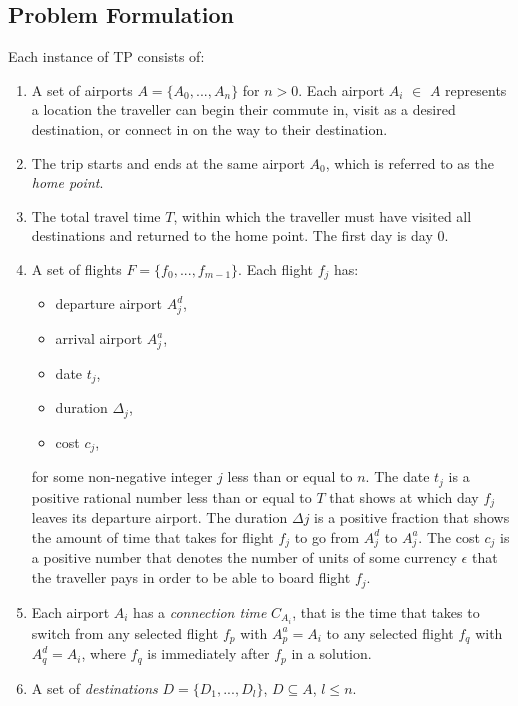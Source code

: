 \documentclass{mpaper}
\begin{document}
\subsection{Problem Formulation}
\label{sec:tpformulation}
Each instance of TP consists of:
\begin{enumerate}[topsep=0.1pt]
\setlength\itemsep{0.1em}
\item A set of airports $A = \{ A_{0},...,A_{n} \}$ for $n > 0$. Each airport $A_{i}$ $\in$ $A$ represents a location the traveller can begin their commute in, visit as a desired destination, or connect in on the way to their destination.

\item The trip starts and ends at the same airport $A_{0}$, which is referred to as the \textit{home point}.

\item The total travel time $T$, within which the traveller must have visited all destinations and returned to the home point. The first day is day 0.
 
\item A set of flights $F = \{ f_{0},...,f_{m-1} \}$. Each flight $f_{j}$ has:
\begin{itemize}[topsep=1pt]
\setlength\itemsep{0.1em}
\item departure airport $A^{d}_{j}$,
\item arrival airport $A^{a}_{j}$,
\item date $t_{j}$,
\item duration $\Delta_{j}$,
\item cost $c_{j}$,
\end{itemize} 
for some non-negative integer $j$ less than or equal to $n$.
The date $t_{j}$ is a positive rational number less than or equal to $T$ that shows at which day $f_{j}$ leaves its departure airport. The duration $\Delta{j}$ is a positive fraction that shows the amount of time that takes for flight $f_{j}$ to go from $A^{d}_{j}$ to $A^{a}_{j}$. The cost $c_{j}$ is a positive number that denotes the number of units of some currency $\epsilon$ that the traveller pays in order to be able to board flight $f_{j}$.

\item Each airport $A_{i}$ has a \textit{connection time} $C_{A_{i}}$, that is the time that takes to switch from any selected flight $f_{p}$ with $A^{a}_{p} = A_{i}$ to any selected flight $f_{q}$ with $A^{d}_{q} = A_{i}$, where $f_{q}$ is immediately after $f_{p}$ in a solution.

\item A set of \textit{destinations} $D = \{ D_{1},...,D_{l} \}$, $D \subseteq A$, $l \leq n$.
\end{enumerate}
\end{document}
